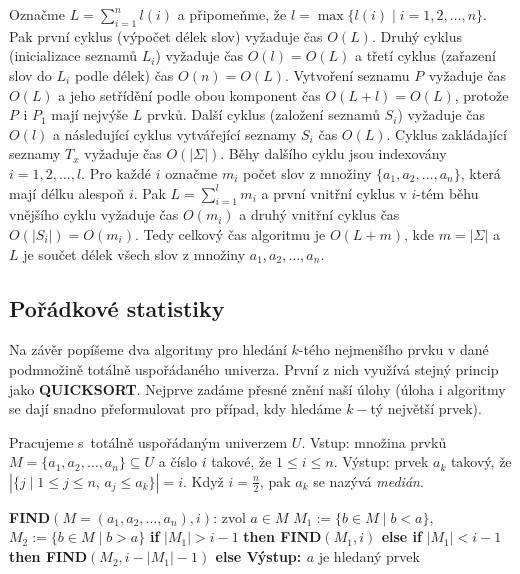 \documentclass[a4paper,12pt]{article}
\begin{document}
Označme $L=\sum_{i=1}^nl(i)$ a připomeňme, že 
$l=\max\{l(i)\mid i=1,2,\dots,n\}$. Pak první cyklus (výpočet  
délek slov) vy\-žaduje čas $O(L)$. Druhý cyklus (inicializace 
seznamů $L_i$) vyžaduje 
čas $O(l)=O(L)$ a třetí cyklus (zařazení slov do $
L_i$ podle 
délek) čas $O(n)=O(L)$. Vytvoření 
seznamu $P_{}$ vyžaduje čas $O(L)$ a jeho setřídění podle obou 
komponent  
čas $O(L+l)=O(L)$, protože $P_{}$ i $P_1$ mají nejvýše $
L$ 
prvků. Další cyklus (založení seznamů 
$S_i$) vyžaduje čas $O(l)$ a následující cyklus vytvářející 
seznamy $S_i$ čas $O(L)$. Cyklus zakládající 
seznamy $T_x$ vyžaduje čas $O(|\Sigma |)$. Běhy dalšího cyklu jsou 
indexovány $i=1,2,\dots,l$. Pro každé $i$ označme $m_i$ počet slov z 
množiny $\{a_1,a_2,\dots,a_n\}$, která mají délku alespoň $
i$. Pak 
$L=\sum_{i=1}^lm_i$ a první vnitřní cyklus v $i$-tém běhu vnějšího 
cyklu vyžaduje čas $O(m_i)$ a druhý vnitřní cyklus 
čas $O(|S_i|)=O(m_i)$. Tedy 
celkový čas algoritmu je $O(L+m)$, kde $m=|\Sigma |$ a $L$ 
je součet délek všech slov z množiny $a_1,a_2,\dots,a_
n$.

\subsection{Pořádkové statistiky}

Na závěr popíšeme dva algoritmy pro hledání $
k$-tého 
nejmenší\-ho prvku v dané podmnožině totálně 
uspořádané\-ho univerza. Prv\-ní z nich využívá  
stejný princip jako {\bf QUICKSORT}. Nejprve zadáme 
přesné zně\-ní naší úlohy (úloha i algoritmy se dají 
snadno přeformulovat pro případ, kdy hledáme $k-$tý 
největší prvek).

Pracujeme s~totálně uspořádaným univerzem $
U$.\newline 
Vstup: množina prvků $M=\{a_1,a_2,\dots,a_n\}\subseteq 
U$ a číslo $i$ takové, 
že $1\le i\le n$.\newline 
Výstup: prvek $a_k$ takový, že 
$|\{j\mid 1\le j\le n,\,a_j\le a_k\}|=i$.\newline 
Když $i=\frac n2$, pak $a_k$ se nazývá \emph{medián}.

{\bf FIND$(M=(a_1,a_2,\dots,a_n),i)$}:\newline 
zvol $a\in M$\newline
$M_1:=\{b\in M\mid b<a\}$, 
$M_2:=\{b\in M\mid b>a\}$\newline 
{\bf if} $|M_1|>i-1$ {\bf then\newline 
\phantom{{\rm ---}}FIND$(M_1,i)$\newline 
else\newline 
\phantom{{\rm ---}}if} $|M_1|<i-1$ {\bf then\newline 
\phantom{{\rm ------}}FIND$(M_2,i-|M_1|-1)$\newline 
\phantom{{\rm ---}}else\newline 
\phantom{{\rm------}}Výstup: $a$} je hledaný prvek\newline 
\phantom{---}{\bf endif\newline 
endif}
\end{document}
